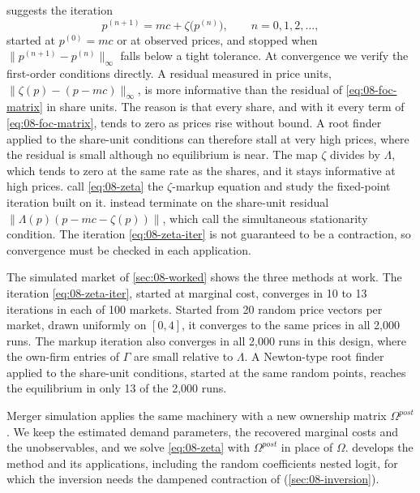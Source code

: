  suggests the iteration
\begin{equation}\label{eq:08-zeta-iter}
  p^{(n+1)} = mc + \zeta\big(p^{(n)}\big), \qquad n = 0, 1, 2, \dots,
\end{equation}
started at $p^{(0)} = mc$ or at observed prices, and stopped when $\|p^{(n+1)} - p^{(n)}\|_\infty$ falls below a tight
tolerance. At convergence we verify the first-order conditions directly. A residual measured in price units,
$\|\zeta(p) - (p - mc)\|_\infty$, is more informative than the residual of \eqref{eq:08-foc-matrix} in share units.
The reason is that every share, and with it every term of \eqref{eq:08-foc-matrix}, tends to zero as prices rise
without bound. A root finder applied to the share-unit conditions can therefore stall at very high prices, where the
residual is small although no equilibrium is near. The map $\zeta$ divides by $\Lambda$, which tends to zero at the
same rate as the shares, and it stays informative at high prices. \citet{MorrowSkerlos2011} call
\eqref{eq:08-zeta} the $\zeta$-markup equation and study the fixed-point iteration built on it.
\citet[n.~65]{ConlonGortmaker2020} instead terminate on the share-unit residual $\|\Lambda(p)(p - mc - \zeta(p))\|$,
which \citet[Section~2.3]{MorrowSkerlos2011} call the simultaneous stationarity condition.
The iteration \eqref{eq:08-zeta-iter} is not guaranteed to be a contraction, so convergence must be checked in each
application.

The simulated market of \cref{sec:08-worked} shows the three methods at work. The iteration
\eqref{eq:08-zeta-iter}, started at marginal cost, converges in 10 to 13 iterations in each of 100 markets. Started
from 20 random price vectors per market, drawn uniformly on $[0, 4]$, it converges to the same prices in all 2,000
runs. The markup iteration also converges in all 2,000 runs in this design, where the own-firm entries of $\Gamma$
are small relative to $\Lambda$. A Newton-type root finder applied to the share-unit conditions, started at the same
random points, reaches the equilibrium in only 13 of the 2,000 runs.

Merger simulation applies the same machinery with a new ownership matrix $\Omega^{post}$. We keep the estimated
demand parameters, the recovered marginal costs and the unobservables, and we solve \eqref{eq:08-zeta} with
$\Omega^{post}$ in place of $\Omega$.  develops the method and its applications, including the
random coefficients nested logit, for which the inversion needs the dampened contraction of
\citet{GrigolonVerboven2014} (\cref{sec:08-inversion}).

